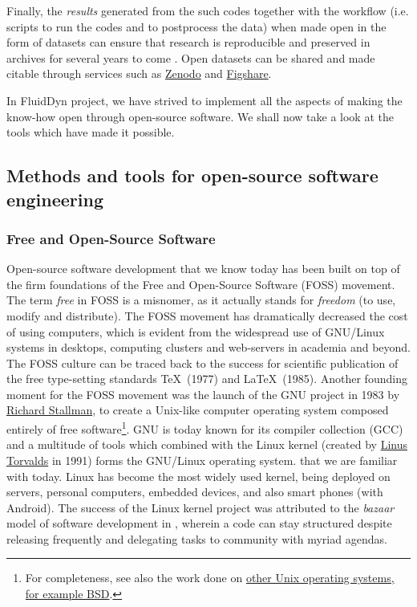 Finally, the \emph{results} generated from the such codes together with the
workflow (i.e. scripts to run the codes and to postprocess the data) when made
open in the form of datasets can ensure that research is reproducible and
preserved in archives for several years to come \citep{gewin_data_2016}. Open
datasets can be shared and made citable through services such as
\href{https://zenodo.org}{Zenodo} and \href{https://figshare.com}{Figshare}.

In FluidDyn project, we have strived to implement all the aspects of making the
know-how open through open-source software. We shall now take a look at the
tools which have made it possible.

\subsection{Methods and tools for open-source software engineering}

\subsubsection{Free and Open-Source Software}

Open-source software development that we know today has been built on top of
the firm foundations of the Free and Open-Source Software (FOSS) movement. The
term \emph{free} in FOSS is a misnomer, as it actually stands for
\emph{freedom} (to use, modify and distribute). The FOSS movement has
dramatically decreased the cost of using computers, which is evident from the
widespread use of GNU/Linux systems in desktops, computing clusters and
web-servers in academia and beyond.
%
The FOSS culture can be traced back to the success for scientific publication
of the free type-setting standards \TeX\ (1977) and \LaTeX\ (1985).
%
Another founding moment for the FOSS movement was the launch of the GNU project
in 1983 by \href{https://en.wikipedia.org/wiki/Richard_Stallman}{Richard
  Stallman}, to create a Unix-like computer operating system composed entirely
  of free software\footnote{For completeness, see also the work done on
  \href{https://www.levenez.com/unix/}{other Unix operating systems, for
example BSD}.}.
%
GNU is today known for its compiler collection (GCC) and a multitude of tools
which combined with the Linux kernel (created by
\href{https://en.wikipedia.org/wiki/Linus_Torvalds}{Linus Torvalds} in 1991)
forms the GNU/Linux operating system.
that we are familiar with today.
%
%
Linux has become the most widely used kernel, being deployed on servers,
personal computers, embedded devices, and also smart phones (with Android). The
success of the Linux kernel project was attributed to the \emph{bazaar} model of
software development in \citet{raymond_cathedral_1999}, wherein a code can stay
structured despite releasing frequently and delegating tasks to community with
myriad agendas.

